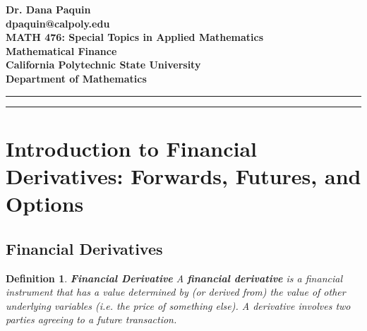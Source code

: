 \documentclass[letterpaper,10pt]{article}
\newtheorem{df}{Definition}[section]
\begin{document}
\setcounter{tocdepth}{2}



\begin{center}

\Large

{\bf Dr. Dana Paquin}\\

{\bf dpaquin@calpoly.edu}\\

{\bf MATH 476: Special Topics in Applied Mathematics\\Mathematical Finance}\\

{\bf California Polytechnic State University}\\

{\bf Department of Mathematics}

\end{center}

\bigskip

\hrule

\bigskip


\tableofcontents


\bigskip

\hrule

\bigskip

\newpage



\section{Introduction to Financial Derivatives: Forwards, Futures, and Options}



\subsection{Financial Derivatives}


\begin{df}{\bf Financial Derivative}
A {\bf financial derivative} is a financial instrument that has a value determined by (or {\em derived from}) the value of other underlying variables (i.e. the price of something else).  A derivative involves two parties agreeing to a future transaction.
\end{df}
\end{document}
